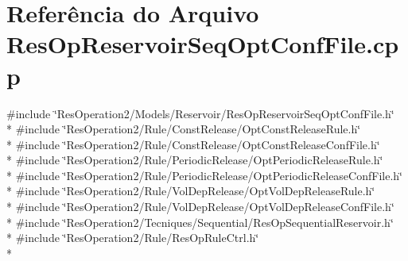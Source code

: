 \section{Referência do Arquivo Res\+Op\+Reservoir\+Seq\+Opt\+Conf\+File.\+cpp}
\label{_res_op_reservoir_seq_opt_conf_file_8cpp}
{\ttfamily \#include \char`\"{}Res\+Operation2/\+Models/\+Reservoir/\+Res\+Op\+Reservoir\+Seq\+Opt\+Conf\+File.\+h\char`\"{}}\\*
{\ttfamily \#include \char`\"{}Res\+Operation2/\+Rule/\+Const\+Release/\+Opt\+Const\+Release\+Rule.\+h\char`\"{}}\\*
{\ttfamily \#include \char`\"{}Res\+Operation2/\+Rule/\+Const\+Release/\+Opt\+Const\+Release\+Conf\+File.\+h\char`\"{}}\\*
{\ttfamily \#include \char`\"{}Res\+Operation2/\+Rule/\+Periodic\+Release/\+Opt\+Periodic\+Release\+Rule.\+h\char`\"{}}\\*
{\ttfamily \#include \char`\"{}Res\+Operation2/\+Rule/\+Periodic\+Release/\+Opt\+Periodic\+Release\+Conf\+File.\+h\char`\"{}}\\*
{\ttfamily \#include \char`\"{}Res\+Operation2/\+Rule/\+Vol\+Dep\+Release/\+Opt\+Vol\+Dep\+Release\+Rule.\+h\char`\"{}}\\*
{\ttfamily \#include \char`\"{}Res\+Operation2/\+Rule/\+Vol\+Dep\+Release/\+Opt\+Vol\+Dep\+Release\+Conf\+File.\+h\char`\"{}}\\*
{\ttfamily \#include \char`\"{}Res\+Operation2/\+Tecniques/\+Sequential/\+Res\+Op\+Sequential\+Reservoir.\+h\char`\"{}}\\*
{\ttfamily \#include \char`\"{}Res\+Operation2/\+Rule/\+Res\+Op\+Rule\+Ctrl.\+h\char`\"{}}\\*
